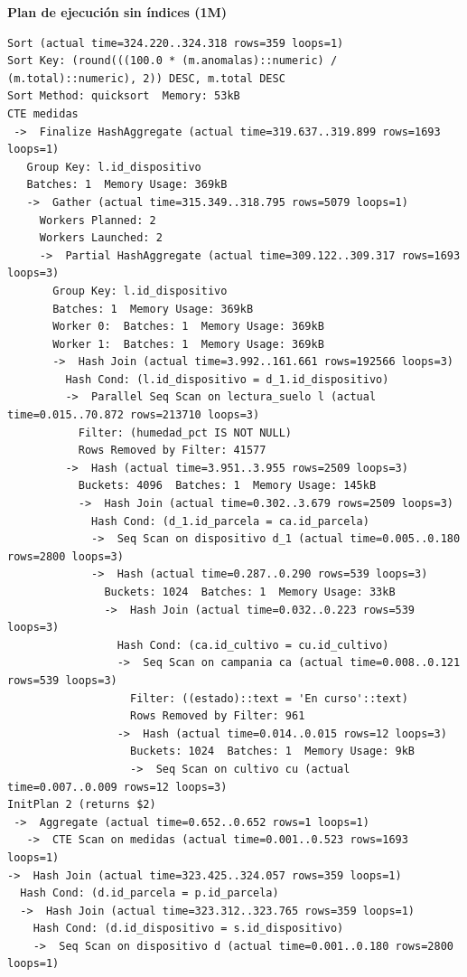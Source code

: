 \documentclass[11pt,letterpaper]{article}
\begin{document}
\textbf{Plan de ejecución sin índices (1M)}
\begin{lstlisting}[style=plano]
Sort (actual time=324.220..324.318 rows=359 loops=1)
Sort Key: (round(((100.0 * (m.anomalas)::numeric) / (m.total)::numeric), 2)) DESC, m.total DESC
Sort Method: quicksort  Memory: 53kB
CTE medidas
 ->  Finalize HashAggregate (actual time=319.637..319.899 rows=1693 loops=1)
   Group Key: l.id_dispositivo
   Batches: 1  Memory Usage: 369kB
   ->  Gather (actual time=315.349..318.795 rows=5079 loops=1)
     Workers Planned: 2
     Workers Launched: 2
     ->  Partial HashAggregate (actual time=309.122..309.317 rows=1693 loops=3)
       Group Key: l.id_dispositivo
       Batches: 1  Memory Usage: 369kB
       Worker 0:  Batches: 1  Memory Usage: 369kB
       Worker 1:  Batches: 1  Memory Usage: 369kB
       ->  Hash Join (actual time=3.992..161.661 rows=192566 loops=3)
         Hash Cond: (l.id_dispositivo = d_1.id_dispositivo)
         ->  Parallel Seq Scan on lectura_suelo l (actual time=0.015..70.872 rows=213710 loops=3)
           Filter: (humedad_pct IS NOT NULL)
           Rows Removed by Filter: 41577
         ->  Hash (actual time=3.951..3.955 rows=2509 loops=3)
           Buckets: 4096  Batches: 1  Memory Usage: 145kB
           ->  Hash Join (actual time=0.302..3.679 rows=2509 loops=3)
             Hash Cond: (d_1.id_parcela = ca.id_parcela)
             ->  Seq Scan on dispositivo d_1 (actual time=0.005..0.180 rows=2800 loops=3)
             ->  Hash (actual time=0.287..0.290 rows=539 loops=3)
               Buckets: 1024  Batches: 1  Memory Usage: 33kB
               ->  Hash Join (actual time=0.032..0.223 rows=539 loops=3)
                 Hash Cond: (ca.id_cultivo = cu.id_cultivo)
                 ->  Seq Scan on campania ca (actual time=0.008..0.121 rows=539 loops=3)
                   Filter: ((estado)::text = 'En curso'::text)
                   Rows Removed by Filter: 961
                 ->  Hash (actual time=0.014..0.015 rows=12 loops=3)
                   Buckets: 1024  Batches: 1  Memory Usage: 9kB
                   ->  Seq Scan on cultivo cu (actual time=0.007..0.009 rows=12 loops=3)
InitPlan 2 (returns $2)
 ->  Aggregate (actual time=0.652..0.652 rows=1 loops=1)
   ->  CTE Scan on medidas (actual time=0.001..0.523 rows=1693 loops=1)
->  Hash Join (actual time=323.425..324.057 rows=359 loops=1)
  Hash Cond: (d.id_parcela = p.id_parcela)
  ->  Hash Join (actual time=323.312..323.765 rows=359 loops=1)
    Hash Cond: (d.id_dispositivo = s.id_dispositivo)
    ->  Seq Scan on dispositivo d (actual time=0.001..0.180 rows=2800 loops=1)

\end{lstlisting}
\end{document}
